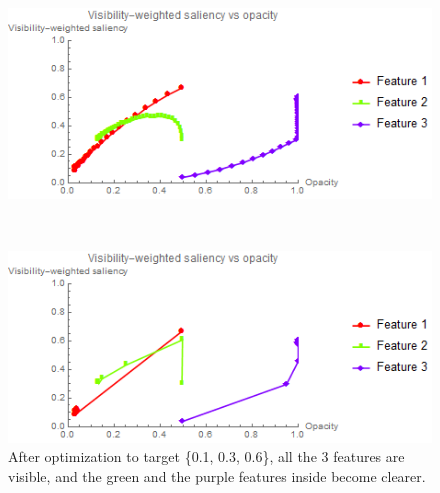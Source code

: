 \begin{figure}
	\begin{minipage}{.49\textwidth}
		\includegraphics[width=1\linewidth]{images/CT-Knee_naive_saliencyopacity_fixed}
		\subcaption{}
	\end{minipage}~
	\begin{minipage}{.49\textwidth}
		\includegraphics[width=1\linewidth]{images/CT-Knee_naive_saliencyopacity_parallelsearch}
		\subcaption{}
	\end{minipage}
	\caption{After optimization to target \{0.1, 0.3, 0.6\}, all the 3 features are visible, and the green and the purple features inside become clearer.}
	\label{fig:CT-Knee_naive_optimized}
\end{figure}

